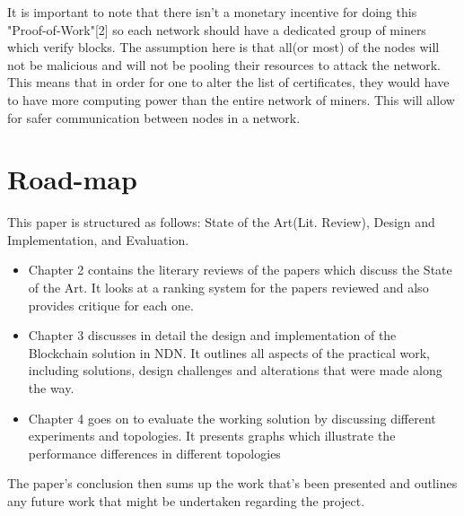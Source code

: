  It is important to note that there isn't a monetary incentive for doing this "Proof-of-Work"[2] so each network should have a dedicated group of miners which verify blocks. The assumption here is that all(or most) of the nodes will not be malicious and will not be pooling their resources to attack the network. This means that in order for one to alter the list of certificates, they would have to have more computing power than the entire network of miners. This will allow for safer communication between nodes in a network. 

\section{Road-map}

This paper is structured as follows: State of the Art(Lit. Review), Design and Implementation, and Evaluation.
\begin{itemize}
\item Chapter 2 contains the literary reviews of the papers which discuss the State of the Art. It looks at a ranking system for the papers reviewed and also provides critique for each one. 

\item Chapter 3 discusses in detail the design and implementation of the Blockchain solution in NDN. It outlines all aspects of the practical work, including solutions, design challenges and alterations that were made along the way.

\item Chapter 4 goes on to evaluate the working solution by discussing different experiments and topologies. It presents graphs which illustrate the performance differences in different topologies
\end{itemize}
The paper's conclusion then sums up the work that's been presented and outlines any future work that might be undertaken regarding the project.